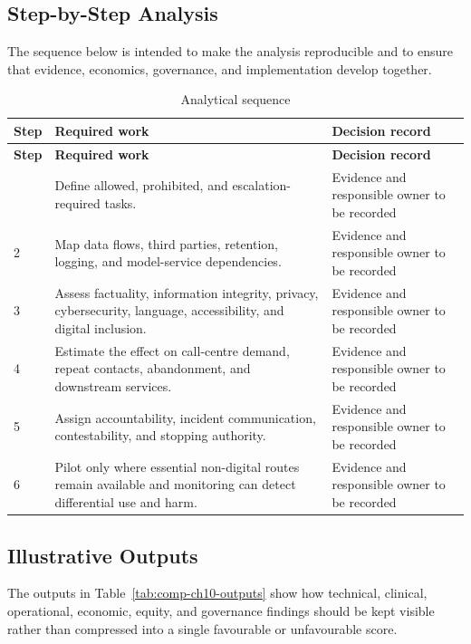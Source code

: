 \subsection{Step-by-Step Analysis}
The sequence below is intended to make the analysis reproducible and to ensure
that evidence, economics, governance, and implementation develop together.

\begin{longtable}{@{}p{}p{}p{}@{}}
\caption{Analytical sequence}
\label{tab:comp-ch10-analysis-steps}\\
\toprule
\textbf{Step} & \textbf{Required work} & \textbf{Decision record} \\
\midrule
\endfirsthead
\toprule
\textbf{Step} & \textbf{Required work} & \textbf{Decision record} \\
\midrule
\endhead
\bottomrule
\endlastfoot
1 & Define allowed, prohibited, and escalation-required tasks. & Evidence and responsible owner to be recorded \\
2 & Map data flows, third parties, retention, logging, and model-service dependencies. & Evidence and responsible owner to be recorded \\
3 & Assess factuality, information integrity, privacy, cybersecurity, language, accessibility, and digital inclusion. & Evidence and responsible owner to be recorded \\
4 & Estimate the effect on call-centre demand, repeat contacts, abandonment, and downstream services. & Evidence and responsible owner to be recorded \\
5 & Assign accountability, incident communication, contestability, and stopping authority. & Evidence and responsible owner to be recorded \\
6 & Pilot only where essential non-digital routes remain available and monitoring can detect differential use and harm. & Evidence and responsible owner to be recorded \\
\end{longtable}

\subsection{Illustrative Outputs}
The outputs in Table~\ref{tab:comp-ch10-outputs} show how technical,
clinical, operational, economic, equity, and governance findings should be kept
visible rather than compressed into a single favourable or unfavourable score.

